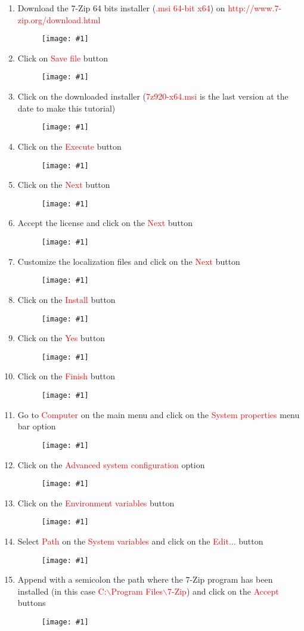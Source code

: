 \documentclass[a4paper]{article}
\newcommand{\FIGURE}[1]
{
	\begin{figure}[!ht]
	\centering
	\texttt{[image: \#1]}
	\end{figure}
}
\newcommand{\RED}[1] {\textcolor{red}{#1}}
\begin{document}
\begin{enumerate}

\item Download the 7-Zip 64 bits installer (\RED{.msi 64-bit x64}) on \newline
\RED{http://www.7-zip.org/download.html}

\FIGURE{7zip-1.png.eps}

\clearpage

\item Click on \RED{Save file} button
\FIGURE{7zip-2.png.eps}

\item Click on the downloaded installer (\RED{7z920-x64.msi} is the last version
at the date to make this tutorial)

\FIGURE{7zip-3.png.eps}

\clearpage

\item Click on the \RED{Execute} button
\FIGURE{7zip-4.png.eps}

\item Click on the \RED{Next} button
\FIGURE{7zip-5.png.eps}

\clearpage

\item Accept the license and click on the \RED{Next} button
\FIGURE{7zip-6.png.eps}

\item Customize the localization files and click on the \RED{Next} button
\FIGURE{7zip-7.png.eps}

\clearpage

\item Click on the \RED{Install} button
\FIGURE{7zip-8.png.eps}

\item Click on the \RED{Yes} button
\FIGURE{7zip-9.png.eps}

\clearpage

\item Click on the \RED{Finish} button
\FIGURE{7zip-10.png.eps}

\item Go to \RED{Computer} on the main menu and click on the
\RED{System properties} menu bar option
\FIGURE{7zip-11.png.eps}

\clearpage

\item Click on the \RED{Advanced system configuration} option
\FIGURE{7zip-12.png.eps}

\item Click on the \RED{Environment variables} button
\FIGURE{7zip-13.png.eps}

\clearpage

\item Select \RED{Path} on the \RED{System variables} and click on the
\RED{Edit...} button
\FIGURE{7zip-14.png.eps}

\item Append with a semicolon the path where the 7-Zip program has been
installed (in this case \RED{C:$\backslash$Program Files$\backslash$7-Zip}) and
click on the \RED{Accept} buttons
\FIGURE{7zip-15.png.eps}

\end{enumerate}
\end{document}
